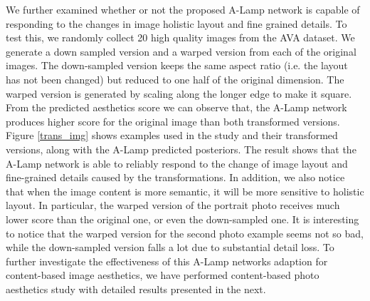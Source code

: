 \documentclass[10pt,twocolumn,letterpaper]{article}
\begin{document}
We further examined whether or not the proposed A-Lamp network is capable of responding to the changes in image holistic layout and fine grained details. To test this, we randomly collect 20 high quality images from the AVA dataset. We generate a down sampled version and a warped version from each of the original images. The down-sampled version keeps the same aspect ratio (i.e. the layout has not been changed) but reduced to one half of the original dimension. The warped version is generated by scaling along the longer edge to make it square. From the predicted aesthetics score we can observe that, the A-Lamp network produces higher score for the original image than both transformed versions. Figure \ref{trans_img} shows examples used in the study and their transformed versions, along with the A-Lamp predicted posteriors. The result shows that the A-Lamp network is able to reliably respond to the change of image layout and fine-grained details caused by the transformations. 
In addition, we also notice that when the image content is more semantic, it will be more sensitive to holistic layout. In particular, the warped version of the portrait photo receives much lower score than the original one, or even the down-sampled one. It is interesting to notice that the warped version for the second photo example seems not so bad, while the down-sampled version falls a lot due to substantial detail loss. To further investigate the effectiveness of this A-Lamp networks adaption for content-based image aesthetics, we have performed content-based photo aesthetics study with detailed results presented in the next.
\end{document}
